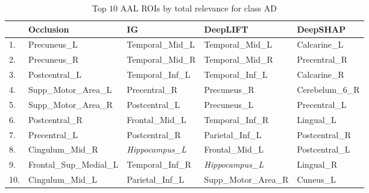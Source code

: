 \begin{table}
	\centering
	\footnotesize
	\begin{tabularx}{\textwidth}{lXXXX}
		\toprule
		    & Occlusion               & IG                    & DeepLIFT              & DeepSHAP        \\
		\midrule
		1.  & Precuneus\_L            & Temporal\_Mid\_L      & Temporal\_Mid\_L      & Calcarine\_L    \\
		2.  & Precuneus\_R            & Temporal\_Mid\_R      & Temporal\_Mid\_R      & Precentral\_R   \\
		3.  & Postcentral\_L          & Temporal\_Inf\_L      & Temporal\_Inf\_L      & Calcarine\_R    \\
		4.  & Supp\_Motor\_Area\_L    & Precentral\_R         & Precuneus\_R          & Cerebelum\_6\_R \\
		5.  & Supp\_Motor\_Area\_R    & Postcentral\_L        & Precuneus\_L          & Precentral\_L   \\
		6.  & Postcentral\_R          & Frontal\_Mid\_L       & Temporal\_Inf\_R      & Lingual\_L      \\
		7.  & Precentral\_L           & Postcentral\_R        & Parietal\_Inf\_L      & Postcentral\_R  \\
		8.  & Cingulum\_Mid\_R        & \emph{Hippocampus\_L} & Frontal\_Mid\_L       & Postcentral\_L  \\
		9.  & Frontal\_Sup\_Medial\_L & Temporal\_Inf\_R      & \emph{Hippocampus\_L} & Lingual\_R      \\
		10. & Cingulum\_Mid\_L        & Parietal\_Inf\_L      & Supp\_Motor\_Area\_R  & Cuneus\_L       \\
		\bottomrule
	\end{tabularx}
	\caption*{Top $10$ AAL ROIs by total relevance for class AD}\label{tab:top10-total}
\end{table}
